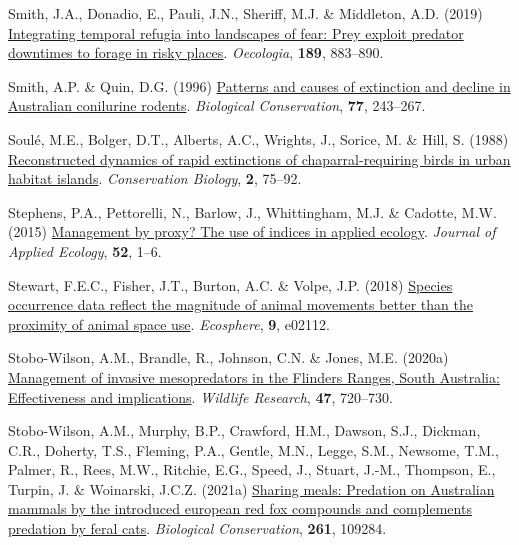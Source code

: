 \documentclass[11pt,a4paper,titlepage,twoside,openright]{style/unimelbthesis}
\newenvironment{CSLReferences}%
  {}%
  {\par}
\begin{document}
\begin{mainmatter}
\begin{CSLReferences}{1}{0}
\leavevmode{}%
Smith, J.A., Donadio, E., Pauli, J.N., Sheriff, M.J. \& Middleton, A.D. (2019) \href{https://doi.org/10.1007/s00442-019-04381-5}{Integrating temporal refugia into landscapes of fear: Prey exploit predator downtimes to forage in risky places}. \emph{Oecologia}, \textbf{189}, 883--890.

\leavevmode{}%
Smith, A.P. \& Quin, D.G. (1996) \href{https://doi.org/10.1016/0006-3207(96)00002-X}{Patterns and causes of extinction and decline in {{A}ustralian} conilurine rodents}. \emph{Biological Conservation}, \textbf{77}, 243--267.

\leavevmode{}%
Soulé, M.E., Bolger, D.T., Alberts, A.C., Wrights, J., Sorice, M. \& Hill, S. (1988) \href{https://doi.org/10.1111/j.1523-1739.1988.tb00337.x}{Reconstructed dynamics of rapid extinctions of chaparral-requiring birds in urban habitat islands}. \emph{Conservation Biology}, \textbf{2}, 75--92.

\leavevmode{}%
Stephens, P.A., Pettorelli, N., Barlow, J., Whittingham, M.J. \& Cadotte, M.W. (2015) \href{https://doi.org/10.1111/1365-2664.12383}{Management by proxy? The use of indices in applied ecology}. \emph{Journal of Applied Ecology}, \textbf{52}, 1--6.

\leavevmode{}%
Stewart, F.E.C., Fisher, J.T., Burton, A.C. \& Volpe, J.P. (2018) \href{https://doi.org/10.1002/ecs2.2112}{Species occurrence data reflect the magnitude of animal movements better than the proximity of animal space use}. \emph{Ecosphere}, \textbf{9}, e02112.

\leavevmode{}%
Stobo-Wilson, A.M., Brandle, R., Johnson, C.N. \& Jones, M.E. (2020a) \href{https://doi.org/10.1071/WR19237}{Management of invasive mesopredators in the {Flinders Ranges, South {A}ustralia}: Effectiveness and implications}. \emph{Wildlife Research}, \textbf{47}, 720--730.

\leavevmode{}%
Stobo-Wilson, A.M., Murphy, B.P., Crawford, H.M., Dawson, S.J., Dickman, C.R., Doherty, T.S., Fleming, P.A., Gentle, M.N., Legge, S.M., Newsome, T.M., Palmer, R., Rees, M.W., Ritchie, E.G., Speed, J., Stuart, J.-M., Thompson, E., Turpin, J. \& Woinarski, J.C.Z. (2021a) \href{https://doi.org/10.1016/j.biocon.2021.109284}{Sharing meals: Predation on {{A}ustralian} mammals by the introduced european red fox compounds and complements predation by feral cats}. \emph{Biological Conservation}, \textbf{261}, 109284.


\end{CSLReferences}
\end{mainmatter}
\end{document}
